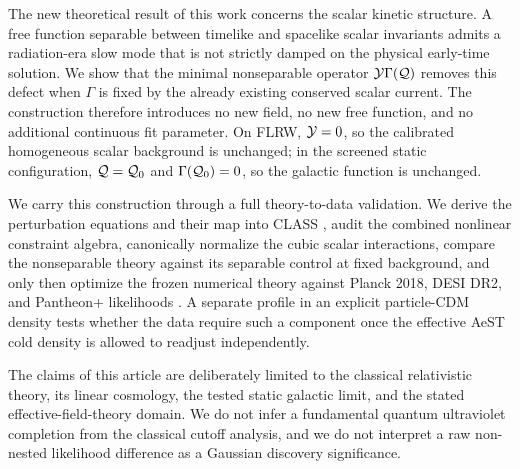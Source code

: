 The new theoretical result of this work concerns the scalar kinetic structure. A free function separable between timelike and spacelike scalar invariants admits a radiation-era slow mode that is not strictly damped on the physical early-time solution. We show that the minimal nonseparable operator $\mathcal{Y}\Gamma(\mathcal{Q})$ removes this defect when $\Gamma$ is fixed by the already existing conserved scalar current. The construction therefore introduces no new field, no new free function, and no additional continuous fit parameter. On FLRW, $\mathcal{Y}=0$, so the calibrated homogeneous scalar background is unchanged; in the screened static configuration, $\mathcal{Q}=\mathcal{Q}_0$ and $\Gamma(\mathcal{Q}_0)=0$, so the galactic function is unchanged.

We carry this construction through a full theory-to-data validation. We derive the perturbation equations and their map into CLASS \cite{Lesgourgues2011CLASS,Blas2011CLASS}, audit the combined nonlinear constraint algebra, canonically normalize the cubic scalar interactions, compare the nonseparable theory against its separable control at fixed background, and only then optimize the frozen numerical theory against Planck 2018, DESI DR2, and Pantheon+ likelihoods \cite{Brout2022,Scolnic2022,DESIDR2II2025}. A separate profile in an explicit particle-CDM density tests whether the data require such a component once the effective AeST cold density is allowed to readjust independently.

The claims of this article are deliberately limited to the classical relativistic theory, its linear cosmology, the tested static galactic limit, and the stated effective-field-theory domain. We do not infer a fundamental quantum ultraviolet completion from the classical cutoff analysis, and we do not interpret a raw non-nested likelihood difference as a Gaussian discovery significance.
